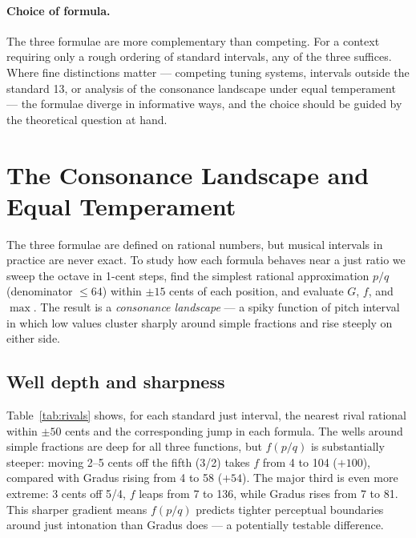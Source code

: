 \documentclass[11pt,a4paper]{article}
\begin{document}
\paragraph{Choice of formula.}
The three formulae are more complementary than competing. For a context
requiring only a rough ordering of standard intervals, any of the three
suffices. Where fine distinctions matter --- competing tuning systems,
intervals outside the standard 13, or analysis of the consonance landscape
under equal temperament --- the formulae diverge in informative ways, and the
choice should be guided by the theoretical question at hand.


\section{The Consonance Landscape and Equal Temperament}

The three formulae are defined on rational numbers, but musical intervals in
practice are never exact. To study how each formula behaves near a just ratio
we sweep the octave in 1-cent steps, find the simplest rational approximation
$p/q$ (denominator $\leq 64$) within $\pm 15$ cents of each position, and
evaluate $G$, $f$, and $\max$. The result is a \emph{consonance landscape}
--- a spiky function of pitch interval in which low values cluster sharply
around simple fractions and rise steeply on either side.

\subsection*{Well depth and sharpness}

Table~\ref{tab:rivals} shows, for each standard just interval, the nearest
rival rational within $\pm 50$ cents and the corresponding jump in each
formula. The wells around simple fractions are deep for all three functions,
but $f(p/q)$ is substantially steeper: moving 2--5 cents off the fifth (3/2)
takes $f$ from 4 to 104 ($+100$), compared with Gradus rising from 4 to 58
($+54$). The major third is even more extreme: 3 cents off 5/4, $f$ leaps
from 7 to 136, while Gradus rises from 7 to 81. This sharper gradient means
$f(p/q)$ predicts tighter perceptual boundaries around just intonation than
Gradus does --- a potentially testable difference.
\end{document}
